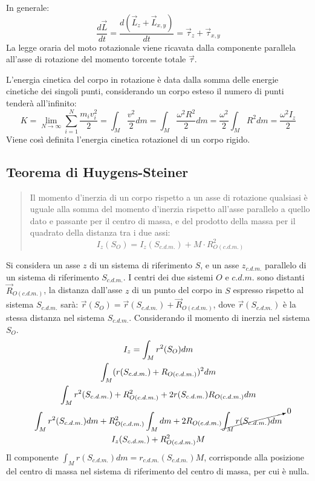 \documentclass{article}
\numberwithin{equation}{subsection}
\begin{document}
In generale: 
\begin{equation*}
    \displaystyle\frac{d\vec{L}}{dt}=\frac{d(\vec{L}_z+\vec{L}_{x,y})}{dt}=\vec{\tau}_z+\vec{\tau}_{x,y}
\end{equation*}
La legge oraria del moto rotazionale viene ricavata dalla componente parallela all'asse di rotazione del momento torcente totale $\vec{\tau}$. 


L'energia cinetica del corpo in rotazione è data dalla somma delle energie 
cinetiche dei singoli punti, considerando un corpo esteso il 
numero di punti tenderà all'infinito:
\begin{equation}
    K=\displaystyle\lim_{N\to\infty}\sum_{i=1}^{N}\frac{m_iv_i^2}{2}=\int_M\frac{v^2}{2}dm=\int_M\frac{\omega^2R^2}{2}dm=\frac{\omega^2}{2}\int_M R^2dm=\frac{\omega^2I_z}{2}
\end{equation}
Viene così definita l'energia cinetica rotazionel di un corpo rigido. 

\subsection{Teorema di Huygens-Steiner}
\begin{quotation}
    Il momento d'inerzia di un corpo rispetto a un asse di 
    rotazione qualsiasi è uguale alla somma del momento d'inerzia rispetto all'asse parallelo a quello dato e 
    passante per il centro di massa, e del prodotto della massa 
    per il quadrato della distanza tra i due assi:
    \begin{equation}
        I_z(S_O)=I_z(S_{c.d.m.})+M\cdot R^2_{O(c.d.m.)}
    \end{equation}
\end{quotation}
Si considera un asse $z$ di un sistema di riferimento $S$, e 
un asse $z_{c.d.m.}$ parallelo di un sistema di riferimento $S_{c.d.m.}$. 
I centri dei due sistemi $O$ e $c.d.m.$ sono distanti $\vec{R}_{O(c.d.m.)}$, 
la distanza dall'asse $z$ di un punto del corpo in $S$ espresso rispetto al 
sistema $S_{c.d.m.}$ sarà: $\vec{r}(S_O)=\vec{r}(S_{c.d.m.})+\vec{R}_{O(c.d.m.)}$,  
dove $\vec{r}(S_{c.d.m.})$ è la stessa distanza nel sistema $S_{c.d.m.}$. 
Considerando il momento di inerzia nel sistema $S_O$. 
\begin{gather*}
    I_z=\displaystyle\int_M {r}^2(S_O)dm\\
    \int_M({r}(S_{c.d.m.})+{R}_{O(c.d.m.)})^2dm\\
    \int_M r^2(S_{c.d.m.})+R_{O(c.d.m.)}^2+2r(S_{c.d.m.})R_{O(c.d.m.)}dm\\
    \int_M r^2(S_{c.d.m.})dm+R_{O(c.d.m.)}^2\int_M dm+2R_{O(c.d.m.)}\cancelto{0}{\int_Mr(S_{c.d.m.})dm}\\
    I_z(S_{c.d.m.})+R_{O(c.d.m.)}^2M
\end{gather*}
Il componente $\displaystyle\int_M r(S_{c.d.m.})dm=r_{c.d.m.}(S_{c.d.m.})M$, corrisponde alla posizione del centro di massa nel sistema di riferimento del centro di massa, per cui è nulla. 
\end{document}
